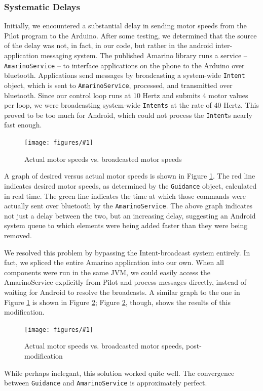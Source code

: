 \documentclass[letterpaper]{article}
\newcommand\figref[1]{Figure \ref{fig:#1}}
\newcommand\code[1]{\texttt{#1}}
\newcommand\imgfig[4]{
\begin{figure}[h]
  \centering
  \texttt{[image: figures/\#1]}
  \caption{#3}
  \label{fig:#4}
\end{figure}}
\begin{document}
\subsubsection{Systematic Delays}
Initially, we encountered a substantial delay in sending motor speeds
from the Pilot program to the Arduino.  After some testing, we
determined that the source of the delay was not, in fact, in our code,
but rather in the android inter-application messaging system.  The
published Amarino library runs a service -- \code{AmarinoService} --
to interface applications on the phone to the Arduino over bluetooth.
Applications send messages by broadcasting a system-wide \code{Intent}
object, which is sent to \code{AmarinoService}, processed, and
transmitted over bluetooth.  Since our control loop runs at 10 Hertz
and submits 4 motor values per loop, we were broadcasting system-wide
\code{Intents} at the rate of 40 Hertz.  This proved to be too much
for Android, which could not process the \code{Intent}s nearly fast
enough.

\imgfig{motor1}{.5}{Actual motor speeds vs. broadcasted motor speeds}{motor1}

A graph of desired versus actual motor speeds is shown in
\figref{motor1}. The red line indicates desired motor speeds, as
determined by the \code{Guidance} object, calculated in real time.
The green line indicates the time at which those commands were
actually sent over bluetooth by the \code{AmarinoService}.  The above
graph indicates not just a delay between the two, but an increasing
delay, suggesting an Android system queue to which elements were being
added faster than they were being removed.

We resolved this problem by bypassing the Intent-broadcast system
entirely.  In fact, we spliced the entire Amarino application into our
own.  When all components were run in the same JVM, we could easily
access the AmarinoService explicitly from Pilot and process messages
directly, instead of waiting for Android to resolve the broadcasts. A
similar graph to the one in \figref{motor1} is shown in
\figref{motor3}; \figref{motor3}, though, shows the results of this
modification.

\imgfig{motor3}{.5}{Actual motor speeds vs. broadcasted motor speeds,
  post-modification}{motor3}

While perhaps inelegant, this solution worked quite well.  The
convergence between \code{Guidance} and \code{AmarinoService} is
approximately perfect.
\end{document}
